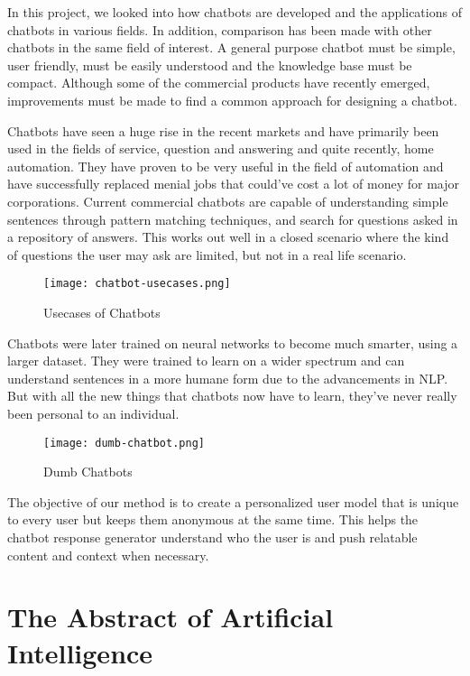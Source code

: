 In this project, we looked into how chatbots are developed and the applications of chatbots in various fields. In addition, comparison has been made with other chatbots in the same field of interest. A general purpose chatbot must be simple, user friendly, must be easily understood and the knowledge base must be compact. Although some of the commercial products have recently emerged, improvements must be made to find a common approach for designing a chatbot.

Chatbots have seen a huge rise in the recent markets and have primarily been used in the fields of service, question and answering and quite recently, home automation. They have proven to be very useful in the field of automation and have successfully replaced menial jobs that could’ve cost a lot of money for major corporations. Current commercial chatbots are capable of understanding simple sentences through pattern matching techniques, and search for questions asked in a repository of answers. This works out well in a closed scenario where the kind of questions the user may ask are limited, but not in a real life scenario.

\begin{figure}[H]
    \centering
    \texttt{[image: chatbot-usecases.png]}
    \caption{Usecases of Chatbots}
    \label{fig:chatbot-usecases}
\end{figure}

Chatbots were later trained on neural networks to become much smarter, using a larger dataset. They were trained to learn on a wider spectrum and can understand sentences in a more humane form due to the advancements in NLP. But with all the new things that chatbots now have to learn, they’ve never really been personal to an individual.

\begin{figure}[H]
    \centering
    \texttt{[image: dumb-chatbot.png]}
    \caption{Dumb Chatbots}
    \label{fig:dumb-chatbot}
\end{figure}

The objective of our method is to create a personalized user model that is unique to every user but keeps them anonymous at the same time. This helps the chatbot response generator understand who the user is and push relatable content and context when necessary.

\pagebreak

\section{The Abstract of Artificial Intelligence}

